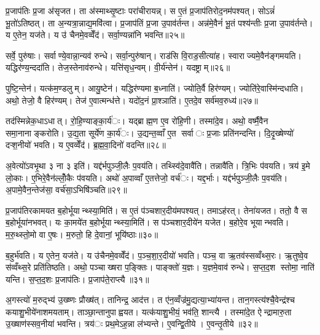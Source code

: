 प्र॒जाप॑तिः प्र॒जा अ॑सृजत। ता अ॑स्माथ्सृ॒ष्टाः परा॑चीरायन्न्। स ए॒तं प्र॒जाप॑तिरोद॒नम॑पश्यत्। सोऽन्नं॑ भू॒तो॑ऽतिष्ठत्। ता अ॒न्यत्रा॒न्नाद्य॒मवि॑त्वा। प्र॒जाप॑तिं प्र॒जा उ॒पाव॑र्तन्त। अन्न॑मे॒वैनं॑ भू॒तं पश्य॑न्तीः प्र॒जा उ॒पाव॑र्तन्ते। य ए॒तेन॒ यज॑ते। य उ॑ चैनमे॒वव्वेँद॑। सर्वा॒ण्यन्ना॑नि भवन्ति॥२५॥

सर्वे॒ पुरु॑षाः। सर्वाण्ये॒वान्ना॒न्यव॑ रुन्धे। सर्वा॒न्पुरु॑षान्। राड॑सि वि॒राड॒सीत्या॑ह। स्वाराज्यमे॒वैन॑ङ्गमयति। यद्धिर॑ण्य॒न्ददा॑ति। तेज॒स्तेनाव॑रुन्धे। यत्ति॑सृध॒न्वम्। वी॒र्य॑न्तेन॑। यदष्ट्राम्॥२६॥

पुष्टि॒न्तेन॑। यत्क॑म॒ण्डलुम्। आयु॒ष्टेन॑। यद्धिर॑ण्यमा ब॒ध्नाति॑। ज्योति॒र्वै हिर॑ण्यम्। ज्योति॑रे॒वास्मि॑न्दधाति। अथो॒ तेजो॒ वै हिर॑ण्यम्। तेज॑ ए॒वात्मन्ध॑त्ते। यदो॑द॒नं प्रा॒श्ञाति॑। ए॒तदे॒व सर्व॑मव॒रुध्य॑॥२७॥

तद॑स्मिन्नेक॒धाऽधात्। रो॒हि॒ण्याङ्का॒र्य॑ः। यद्ब्राह्म॒ण ए॒व रो॑हि॒णी। तस्मा॑दे॒व। अथो॒ वर्ष्मै॒वैन समा॒नानाङ्करोति। उ॒द्य॒ता सूर्ये॑ण का॒र्य॑ः। उ॒द्यन्त॒व्वाँ ए॒त सर्वाः प्र॒जाः प्रति॑नन्दन्ति। दि॒दृ॒ख्षेण्यो॑ दऱ्श॒नीयो॑ भवति। य ए॒वव्वेँद॑। ब्र॒ह्म॒वा॒दिनो॑ वदन्ति॥२८॥

अ॒वेत्यो॑ऽवभृ॒था ३ ना ३ इति॑। यद्द॑र्भपुञ्जी॒लैः प॒वय॑ति। तथ्स्वि॑दे॒वावै॑ति। तन्नावै॑ति। त्रि॒भिः प॑वयति। त्रय॑ इ॒मे लो॒काः। ए॒भिरे॒वैन॑ल्लोँ॒कैः प॑वयति। अथो॑ अ॒पाव्वाँ ए॒तत्तेजो॒ वर्च॑ः। यद्द॒र्भाः। यद्द॑र्भपुञ्जी॒लैः प॒वय॑ति। अ॒पामे॒वैन॒न्तेज॑सा॒ वर्च॑सा॒ऽभिषि॑ञ्चति॥२९॥


प्र॒जाप॑तिरकामयत ब॒होर्भूयान्थ्स्या॒मिति॑। स ए॒तं प॑ञ्चशार॒दीय॑मपश्यत्। तमाऽह॑रत्। तेना॑यजत। ततो॒ वै स ब॒होर्भूया॑नभवत्। यः का॒मये॑त ब॒होर्भूयान्थ्स्या॒मिति॑। स प॑ञ्चशार॒दीये॑न यजेत। ब॒होरे॒व भूयान्भवति। म॒रु॒थ्स्तो॒मो वा ए॒षः। म॒रुतो॒ हि दे॒वानां॒ भूयि॑ष्ठाः॥३०॥

ब॒हुर्भ॑वति। य ए॒तेन॒ यज॑ते। य उ॑चैनमे॒वव्वेँद॑। प॒ञ्च॒शा॒र॒दीयो॑ भवति। पञ्च॒ वा ऋ॒तव॑स्सव्वँथ्स॒रः। ऋ॒तुष्वे॒व स॑व्वँथ्स॒रे प्रति॑तिष्ठति। अथो॒ पञ्चाख्षरा प॒ङ्क्तिः। पाङ्क्तो॑ य॒ज्ञः। य॒ज्ञमे॒वाव॑ रुन्धे। स॒प्त॒द॒श स्तोमा॒ नाति॑ यन्ति। स॒प्त॒द॒शः प्र॒जाप॑तिः। प्र॒जाप॑ते॒राप्त्यै॥३१॥


अ॒गस्त्यो॑ म॒रुद्भ्य॑ उ॒ख्ष्णः प्रौख्ष॑त्। तानिन्द्र॒ आद॑त्त। त ए॑न॒व्वँज्र॑मु॒द्यत्या॒भ्या॑यन्त। तान॒गस्त्य॑श्चै॒वेन्द्र॑श्च कयाशु॒भीये॑नाशमयताम्। ताञ्छा॒न्तानुपाह्वयत। यत्क॑याशु॒भीयं॒ भव॑ति॒ शान्त्यै। तस्मा॑दे॒त ऐन्द्रामारु॒ता उ॒ख्षाण॑स्सव॒नीया॑ भवन्ति। त्रय॑ः प्रथ॒मेऽह॒न्ना ल॑भ्यन्ते। ए॒वन्द्वि॒तीये। ए॒वन्तृ॒तीये॥३२॥

